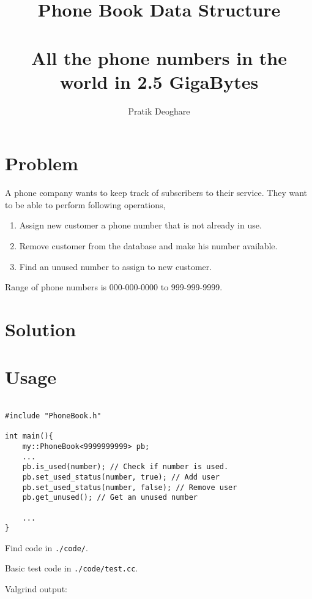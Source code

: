 \documentclass{article}
\title{Phone Book Data Structure
\\
~\\\small{All the phone numbers in the world in 2.5 GigaBytes}}
\author{Pratik Deoghare}
\begin{document}
\maketitle
\tableofcontents

\section{Problem}

A phone company wants to keep track of subscribers to their service. They want
to be able to perform following operations, 

\begin{enumerate}
    \item Assign new customer a phone number that is not already in use.
    \item Remove customer from the database and make his number available. 
    \item Find an unused number to assign to new customer.
\end{enumerate}

Range of phone numbers is 000-000-0000 to 999-999-9999.

\newpage
\section{Solution}

\newpage
\section{Usage}

\begin{verbatim}

#include "PhoneBook.h"

int main(){
    my::PhoneBook<9999999999> pb;
    ...
    pb.is_used(number); // Check if number is used. 
    pb.set_used_status(number, true); // Add user 
    pb.set_used_status(number, false); // Remove user 
    pb.get_unused(); // Get an unused number 

    ...
}

\end{verbatim}


Find code in \texttt{./code/}. 

Basic test code in \texttt{./code/test.cc}. 

Valgrind output: 
\end{document}

